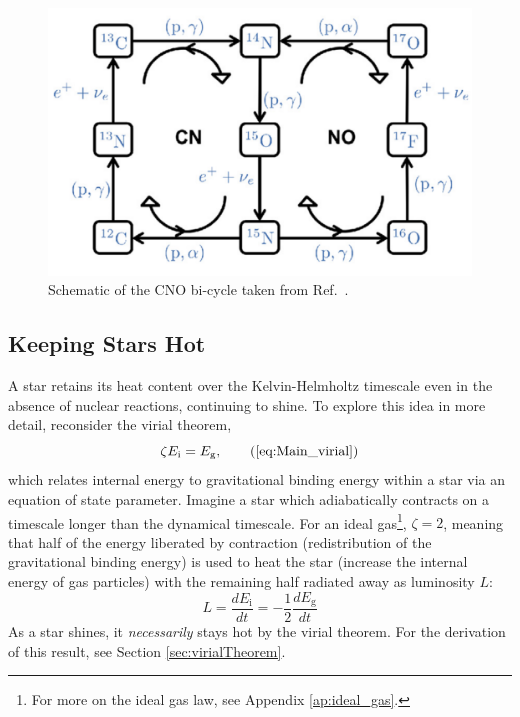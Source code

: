 \documentclass[12pt]{article}
\newcommand{\deriv}[2]{\frac{d #1}{d #2}}
\begin{document}
\begin{figure}[H]
    \centering
    \includegraphics[width=0.5\linewidth]{Main Graphics/CNO_pictorial.png}
    \caption{Schematic of the CNO bi-cycle taken from Ref.~\cite{fusionGraphics}.}
    \label{fig:CNO_pictorial}
\end{figure}

\subsection{Keeping Stars Hot}
A star retains its heat content over the Kelvin-Helmholtz timescale even in the absence of nuclear reactions, continuing to shine. To explore this idea in more detail, reconsider the virial theorem,
%
\begin{equation}
    \zeta E_\mathrm{i} = E_\mathrm{g}, \tag{\ref{eq:Main_virial}}
\end{equation}
%
which relates internal energy to gravitational binding energy within a star via an equation of state parameter. Imagine a star which adiabatically contracts on a timescale longer than the dynamical timescale. For an ideal gas\footnote{For more on the ideal gas law, see Appendix \ref{ap:ideal_gas}.}, $\zeta = 2$, meaning that half of the energy liberated by contraction (redistribution of the gravitational binding energy) is used to heat the star (increase the internal energy of gas particles) with the remaining half radiated away as luminosity $L$:
\begin{equation}
    L = \deriv{E_\mathrm{i}}{t} = -\frac{1}{2} \deriv{E_\mathrm{g}}{t}
\end{equation}
%
As a star shines, it \textit{necessarily} stays hot by the virial theorem. For the derivation of this result, see Section \ref{sec:virialTheorem}.
\end{document}
